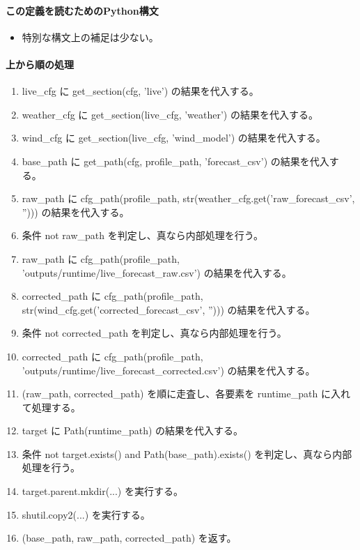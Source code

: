 \documentclass[a4paper,11pt]{article}
\begin{document}
            \paragraph{この定義を読むためのPython構文}
            \begin{itemize}[leftmargin=1.6em]
            \item 特別な構文上の補足は少ない。
            \end{itemize}
            \paragraph{上から順の処理}
            \begin{enumerate}[leftmargin=1.8em]
            \item live\_cfg に get\_section(cfg, 'live') の結果を代入する。
\item weather\_cfg に get\_section(live\_cfg, 'weather') の結果を代入する。
\item wind\_cfg に get\_section(live\_cfg, 'wind\_model') の結果を代入する。
\item base\_path に get\_path(cfg, profile\_path, 'forecast\_csv') の結果を代入する。
\item raw\_path に cfg\_path(profile\_path, str(weather\_cfg.get('raw\_forecast\_csv', ''))) の結果を代入する。
\item 条件 not raw\_path を判定し、真なら内部処理を行う。
\item   raw\_path に cfg\_path(profile\_path, 'outputs/runtime/live\_forecast\_raw.csv') の結果を代入する。
\item corrected\_path に cfg\_path(profile\_path, str(wind\_cfg.get('corrected\_forecast\_csv', ''))) の結果を代入する。
\item 条件 not corrected\_path を判定し、真なら内部処理を行う。
\item   corrected\_path に cfg\_path(profile\_path, 'outputs/runtime/live\_forecast\_corrected.csv') の結果を代入する。
\item (raw\_path, corrected\_path) を順に走査し、各要素を runtime\_path に入れて処理する。
\item   target に Path(runtime\_path) の結果を代入する。
\item   条件 not target.exists() and Path(base\_path).exists() を判定し、真なら内部処理を行う。
\item     target.parent.mkdir(...) を実行する。
\item     shutil.copy2(...) を実行する。
\item (base\_path, raw\_path, corrected\_path) を返す。
            \end{enumerate}
\end{document}
